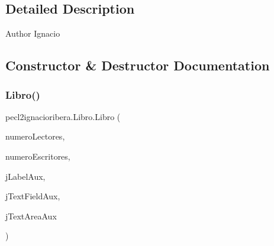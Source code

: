 \subsection{Detailed Description}
\begin{DoxyAuthor}{Author}
Ignacio 
\end{DoxyAuthor}


\subsection{Constructor \& Destructor Documentation}
\mbox{\label{classpecl2ignacioribera_1_1_libro_a959d8e97c56f6a3f9f779f26674f12a2}} 
\subsubsection{\texorpdfstring{Libro()}{Libro()}}
{\footnotesize\ttfamily pecl2ignacioribera.\+Libro.\+Libro (\begin{DoxyParamCaption}\item[{int}]{numero\+Lectores,  }\item[{int}]{numero\+Escritores,  }\item[{javax.\+swing.\+J\+Label}]{j\+Label\+Aux,  }\item[{javax.\+swing.\+J\+Text\+Field}]{j\+Text\+Field\+Aux,  }\item[{javax.\+swing.\+J\+Text\+Area}]{j\+Text\+Area\+Aux }\end{DoxyParamCaption})\hspace{0.3cm}{\ttfamily [inline]}}


